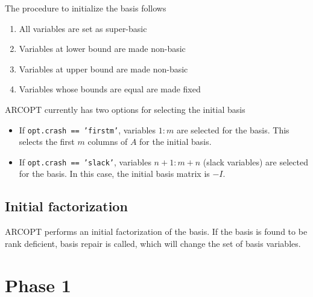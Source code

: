 \documentclass[11pt]{article}
\newcommand{\code}[1]{\texttt{#1}}
\begin{document}
The procedure to initialize the basis follows
\begin{enumerate}
\item All variables are set as super-basic
\item Variables at lower bound are made non-basic
\item Variables at upper bound are made non-basic
\item Variables whose bounds are equal are made fixed
\end{enumerate}

ARCOPT currently has two options for selecting the initial basis
\begin{itemize}
\item If \code{opt.crash == 'firstm'}, variables $1:m$ are selected for the
  basis.  This selects the first $m$ columns of $A$ for the initial basis.
\item If \code{opt.crash == 'slack'}, variables $n+1:m+n$ (slack variables) are
  selected for the basis.  In this case, the initial basis matrix is $-I$.
\end{itemize}

\subsection{Initial factorization}

ARCOPT performs an initial factorization of the basis.  If the basis is found
to be rank deficient, basis repair is called, which will change the set of
basis variables.

\section{Phase 1}
\end{document}
